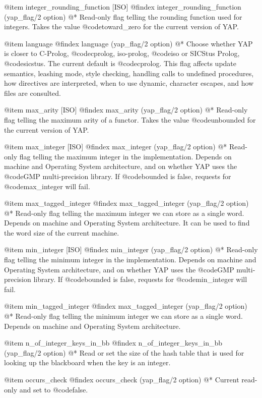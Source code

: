 {{{{{{{{@item integer_rounding_function [ISO]
@findex integer_rounding_function (yap_flag/2 option)
@*
Read-only flag telling the rounding function used for integers. Takes the value
@code{toward_zero} for the current version of YAP.

@item language
@findex language (yap_flag/2 option)
@* 
Choose whether YAP is closer to C-Prolog, @code{cprolog}, iso-prolog,
@code{iso} or SICStus Prolog, @code{sicstus}. The current default is
@code{cprolog}. This flag affects update semantics, leashing mode,
style checking, handling calls to undefined procedures, how directives
are interpreted, when to use dynamic, character escapes, and how files
are consulted.

@item max_arity [ISO]
@findex max_arity (yap_flag/2 option)
@*
Read-only flag telling the maximum arity of a functor. Takes the value
@code{unbounded} for the current version of YAP.

@item max_integer [ISO]
@findex max_integer (yap_flag/2 option)
@*
Read-only flag telling the maximum integer in the
implementation. Depends on machine and Operating System
architecture, and on whether YAP uses the @code{GMP} multi-precision
library. If @code{bounded} is false, requests for @code{max_integer}
will fail.

@item max_tagged_integer 
@findex max_tagged_integer (yap_flag/2 option)
@*
Read-only flag telling the maximum integer we can store as a single
word. Depends on machine and Operating System
architecture. It can be used to find the word size of the current machine.

@item min_integer [ISO]
@findex min_integer (yap_flag/2 option)
@* Read-only flag telling the minimum integer in the
implementation. Depends on machine and Operating System architecture,
and on whether YAP uses the @code{GMP} multi-precision library. If
@code{bounded} is false, requests for @code{min_integer} will fail.

@item min_tagged_integer 
@findex max_tagged_integer (yap_flag/2 option)
@*
Read-only flag telling the minimum integer we can store as a single
word. Depends on machine and Operating System
architecture.

@item n_of_integer_keys_in_bb
@findex n_of_integer_keys_in_bb (yap_flag/2 option)
@*
Read or set the size of the hash table that is used for looking up the
blackboard when the key is an integer.

@item occurs_check
@findex occurs_check (yap_flag/2 option)
@*
Current read-only and set to @code{false}.

}}}}}}}}
